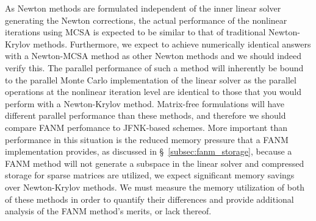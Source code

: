 As Newton methods are formulated independent of the inner linear
solver generating the Newton corrections, the actual performance of
the nonlinear iterations using MCSA is expected to be similar to that
of traditional Newton-Krylov methods. Furthermore, we expect to
achieve numerically identical answers with a Newton-MCSA method as
other Newton methods and we should indeed verify this. The parallel
performance of such a method will inherently be bound to the parallel
Monte Carlo implementation of the linear solver as the parallel
operations at the nonlinear iteration level are identical to those
that you would perform with a Newton-Krylov method. Matrix-free
formulations will have different parallel performance than these
methods, and therefore we should compare FANM perfomance to JFNK-based
schemes. More important than performance in this situation is the
reduced memory pressure that a FANM implementation provides, as
discussed in \S~\ref{subsec:fanm_storage}, because a FANM method will
not generate a subspace in the linear solver and compressed storage
for sparse matrices are utilized, we expect significant memory savings
over Newton-Krylov methods. We must measure the memory utilization of
both of these methods in order to quantify their differences and
provide additional analysis of the FANM method's merits, or lack
thereof.
